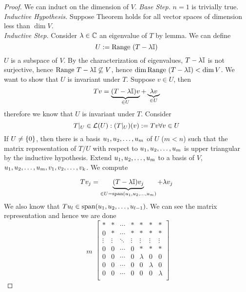 \begin{proof} 
    We can induct on the dimension of $V$. 
    \textit{Base Step.} $n = 1$ is trivially true. \\
    \textit{Inductive Hypothesis.} Suppose Theorem holds for all vector spaces of dimension less than $\dim V$. \\
    \textit{Inductive Step.} Consider $\lambda \in \mathbb C$ an eigenvalue of $T$ by lemma. We can define 
    \[U := \text{Range } (T  -\lambda \mathbb I)\] 
    $U$ is a subspace of $V$. By the characterization of eigenvalues, $T - \lambda \mathbb I$ is not surjective, hence $\text{Range } T - \lambda \mathbb I \not\subseteq V$, hence $\dim \text{Range } (T - \lambda \mathbb I) < \dim V$.
    We want to show that $U$ is invariant under $T$. Suppose $v \in U$, then \[Tv = \underbrace{(T - \lambda \mathbb I)v}_{\in U} + \underbrace{\lambda v}_{\in U}\] therefore we know that $U$ is invariant under $T$. 
    Consider \[T|_U \in \mathcal L(U) : (T|_U)(v) := Tv \forall v \in U\] 
    If $U \neq \left\{ 0 \right\}$, then there is a basis ${u}_1,{u}_2, \ldots, {u}_{m}$ of $U$ ($m < n$) such that the matrix representation of $T/U$ with respect to ${u}_1,{u}_2, \ldots, {u}_{m}$ is upper triangular by the inductive hypothesis. Extend ${u}_1,{u}_2, \ldots, {u}_{m}$ to a basis of $V$, ${u}_1,{u}_2, \ldots, {u}_{m}, {v}_1,{v}_2, \ldots, {v}_{k}$. We compute

    \[Tv_j = \underbrace{(T - \lambda \mathbb I)v_j}_{\in U = \text{span} ({u}_1,{u}_2, \ldots, {u}_{m})} + \lambda v_j\] We also know that $Tu_l \in \text{span} ({u}_1,{u}_2, \ldots, {u}_{l-1})$. We can see the matrix representation and hence we are done
    \[ \begin{array}{cc}
         \\ \\ \\ \\ m \\ \\ \\ 
    \end{array}\left[\begin{array}{cccc|ccccccc}
         * & * & \cdots & * & * & * & * \\
         0 & * & \cdots & * & * & * & * \\
         \vdots & \vdots & \ddots & \vdots & \vdots & \vdots & \vdots \\
         0 & 0 & \cdots & 0 & * & * & * \\
         \hline
         0 & 0 & \cdots & 0 & \lambda & 0 & 0 \\
         0 & 0 & \cdots & 0 & 0 & \lambda & 0 \\
         0 & 0 & \cdots & 0 & 0 & 0 & \lambda \\
    \end{array}\right]\]
\end{proof}
